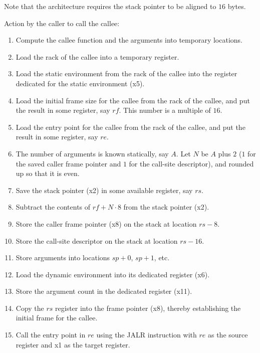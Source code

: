 Note that the \riscv{} architecture requires the stack pointer to be
aligned to $16$ bytes.

Action by the caller to call the callee:

\begin{enumerate}
\item Compute the callee function and the arguments into temporary
  locations.
\item Load the rack of the callee into a temporary register.
\item Load the static environment from the rack of the callee into the
  register dedicated for the static environment (x5).
\item Load the initial frame size for the callee from the rack of the
  callee, and put the result in some register, say $rf$.  This number
  is a multiple of $16$.
\item Load the entry point for the callee from the rack of the callee,
  and put the result in some register, say $re$.
\item The number of arguments is known statically, say $A$.  Let $N$
  be $A$ plus $2$ ($1$ for the saved caller frame pointer and $1$ for
  the call-site descriptor), and rounded up so that it is even.
\item Save the stack pointer (x2) in some available register, say $rs$.
\item Subtract the contents of $rf + N \cdot 8$ from the stack
  pointer (x2).
\item Store the caller frame pointer (x8) on the stack at location $rs
  - 8$.
\item Store the call-site descriptor on the stack at location $rs -
  16$.
\item Store arguments into locations $sp +  0$, $sp +  1$, etc.
\item Load the dynamic environment into its dedicated register (x6).
\item Store the argument count in the dedicated register (x11).
\item Copy the $rs$ register into the frame pointer (x8), thereby
  establishing the initial frame for the callee.
\item Call the entry point in $re$ using the JALR instruction with
  $re$ as the source register and x1 as the target register.
\end{enumerate}

